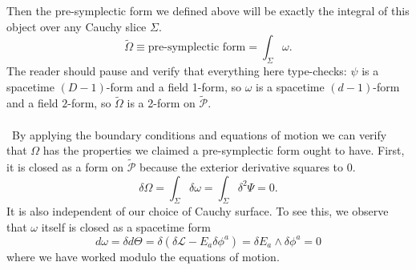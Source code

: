 \documentclass[11pt,letterpaper]{article}
\newcommand{\mc}[1]{\mathcal{#1}}
\begin{document}
Then the pre-symplectic form we defined above will be exactly the integral of this object over any Cauchy slice $\Sigma$. \begin{equation}
\tilde{\Omega} \equiv \mbox{pre-symplectic form} = \int_\Sigma \omega.
\end{equation}
The reader should pause and verify that everything here type-checks: $\psi$ is a spacetime $(D-1)$-form and a field 1-form, so $\omega$ is a spacetime $(d-1)$-form and a field $2$-form, so $\tilde{\Omega}$ is a 2-form on $\tilde{\mc{P}}$.\\
\\
\
By applying the boundary conditions and equations of motion we can verify that $\Omega$ has the properties we claimed a pre-symplectic form ought to have. First, it is closed as a form on  $\tilde{\mc{P}}$ because the exterior derivative squares to 0. \begin{equation}
\delta \Omega = \int_\Sigma \delta \omega = \int_\Sigma \delta^2 \Psi = 0.
\end{equation}
It is also independent of our choice of Cauchy surface. To see this, we observe that $\omega$ itself is closed as a spacetime form \begin{equation}
d \omega = \delta d \Theta = \delta (\delta \mc{L} - E_a \delta \phi^a) = \delta E_a \wedge \delta \phi^a = 0
\end{equation}
where we have worked modulo the equations of motion.
\end{document}
